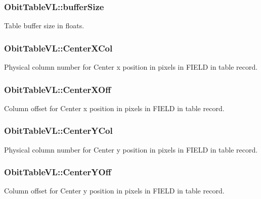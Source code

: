 \subsubsection{ {\bf Obit\-Table\-VL::buffer\-Size}}\label{structObitTableVL_o11}


Table buffer size in floats. 

\subsubsection{ {\bf Obit\-Table\-VL::Center\-XCol}}\label{structObitTableVL_o74}


Physical column number for Center x position in pixels in FIELD in table record. 

\subsubsection{ {\bf Obit\-Table\-VL::Center\-XOff}}\label{structObitTableVL_o73}


Column offset for Center x position in pixels in FIELD in table record. 

\subsubsection{ {\bf Obit\-Table\-VL::Center\-YCol}}\label{structObitTableVL_o76}


Physical column number for Center y position in pixels in FIELD in table record. 

\subsubsection{ {\bf Obit\-Table\-VL::Center\-YOff}}\label{structObitTableVL_o75}


Column offset for Center y position in pixels in FIELD in table record. 

